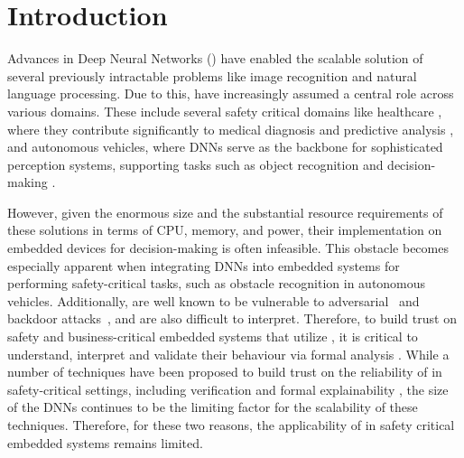 
\section{Introduction}

Advances in Deep Neural Networks (\dnn) have enabled the scalable solution of
several previously intractable problems like image recognition and natural
language processing. Due to this, \dnn have increasingly assumed a central role
across various domains. These include several safety critical domains like
healthcare \cite{b1}, where they contribute significantly to medical
diagnosis and predictive analysis \cite{b2}, and autonomous vehicles, where
DNNs serve as the backbone for sophisticated perception systems, supporting
tasks such as object recognition and decision-making \cite{b3}. 

However, given the enormous size and the substantial resource requirements of
these \dnn solutions in terms of CPU, memory, and power, their implementation
on embedded devices for decision-making is often infeasible.  This obstacle
becomes especially apparent when integrating DNNs into embedded systems for
performing safety-critical tasks, such as obstacle recognition in autonomous
vehicles. Additionally, \dnn are well known to be vulnerable to
adversarial~\cite{l-bfgs,
fgsm, deep-fool, pgd, ground-truth-adv-attack, cw-attack} and backdoor
attacks~\cite{backdoor-poisoning}, and are also difficult to interpret.
Therefore, to build trust on safety and business-critical embedded systems
that utilize \dnn, it is critical to understand, interpret and validate their
behaviour via formal analysis \cite{overview-fxai, minimal-image-fxai,
backdoor-verification, nn-lander-verif, camera-verif-dsouza,
generalization-verif}. While a number of techniques have been proposed to build
trust on the reliability of \dnn in safety-critical settings, including
verification \cite{reluplex, deeppoly, crown, beta-crown, cegar-nn}  and formal
explainability \cite{overview-fxai, minimal-image-fxai}, the size of the DNNs
continues to be the limiting factor for the scalability of these techniques.
Therefore, for these two reasons, the applicability of \dnn in safety critical
 embedded systems remains limited.


